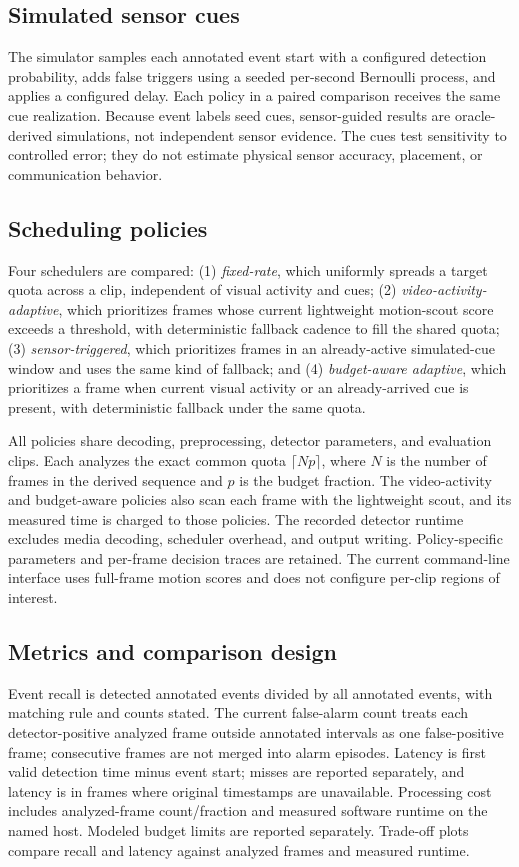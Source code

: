 \documentclass[conference]{IEEEtran}
\begin{document}
\subsection{Simulated sensor cues}
The simulator samples each annotated event start with a configured detection probability, adds false triggers using a seeded per-second Bernoulli process, and applies a configured delay. Each policy in a paired comparison receives the same cue realization. Because event labels seed cues, sensor-guided results are oracle-derived simulations, not independent sensor evidence. The cues test sensitivity to controlled error; they do not estimate physical sensor accuracy, placement, or communication behavior.

\subsection{Scheduling policies}
Four schedulers are compared: (1) \emph{fixed-rate}, which uniformly spreads a target quota across a clip, independent of visual activity and cues; (2) \emph{video-activity-adaptive}, which prioritizes frames whose current lightweight motion-scout score exceeds a threshold, with deterministic fallback cadence to fill the shared quota; (3) \emph{sensor-triggered}, which prioritizes frames in an already-active simulated-cue window and uses the same kind of fallback; and (4) \emph{budget-aware adaptive}, which prioritizes a frame when current visual activity or an already-arrived cue is present, with deterministic fallback under the same quota.

All policies share decoding, preprocessing, detector parameters, and evaluation clips. Each analyzes the exact common quota $\lceil Np\rceil$, where $N$ is the number of frames in the derived sequence and $p$ is the budget fraction. The video-activity and budget-aware policies also scan each frame with the lightweight scout, and its measured time is charged to those policies. The recorded detector runtime excludes media decoding, scheduler overhead, and output writing. Policy-specific parameters and per-frame decision traces are retained. The current command-line interface uses full-frame motion scores and does not configure per-clip regions of interest.

\subsection{Metrics and comparison design}
Event recall is detected annotated events divided by all annotated events, with matching rule and counts stated. The current false-alarm count treats each detector-positive analyzed frame outside annotated intervals as one false-positive frame; consecutive frames are not merged into alarm episodes. Latency is first valid detection time minus event start; misses are reported separately, and latency is in frames where original timestamps are unavailable. Processing cost includes analyzed-frame count/fraction and measured software runtime on the named host. Modeled budget limits are reported separately. Trade-off plots compare recall and latency against analyzed frames and measured runtime.
\end{document}

